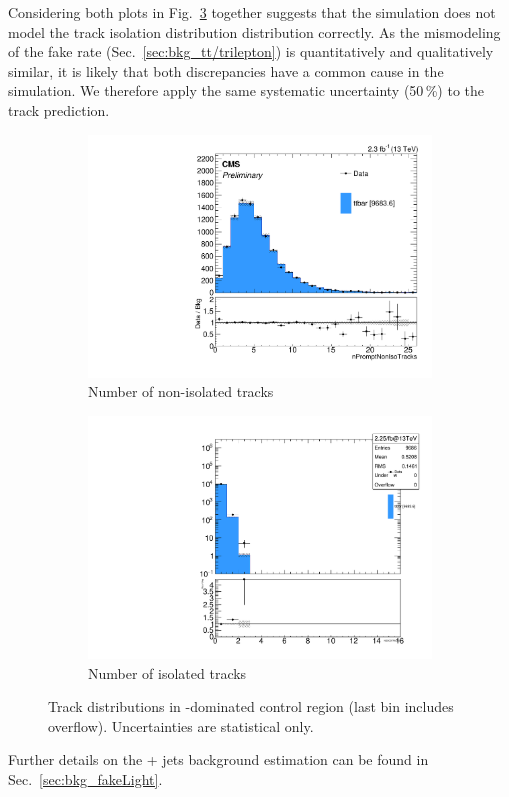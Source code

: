 Considering both plots in Fig.~\ref{fig:tt/track} together suggests that the \ttbar simulation does not model the track isolation distribution distribution correctly. As the mismodeling of the \ttbar fake rate (Sec.~\ref{sec:bkg_tt/trilepton}) is quantitatively and qualitatively similar, it is likely that both discrepancies have a common cause in the simulation. We therefore apply the same systematic uncertainty (50\,\%) to the track prediction.

\begin{figure}
\begin{center}
	\begin{subfigure}[b]{.7\textwidth}
		\includegraphics[width=\textwidth]{Background/bkg_tt/ttbar_NPROMPTNONISOINCLUSIVETRACKS7_STgt300}
		\caption{Number of non-isolated tracks } \label{fig:tt/trackNonIso}
	\end{subfigure}
	\begin{subfigure}[b]{.7\textwidth}
		\includegraphics[width=\textwidth]{Background/bkg_tt/ttbar_NGOODTRACKS_STgt300}
		\caption{Number of isolated tracks } \label{fig:tt/trackIso}
	\end{subfigure}
	\caption{Track distributions in \ttbar-dominated control region (last bin includes overflow). Uncertainties are statistical only.
	\label{fig:tt/track}}
\end{center}
\end{figure}

Further details on the \Z + jets background estimation can be found in Sec.~\ref{sec:bkg_fakeLight}.
